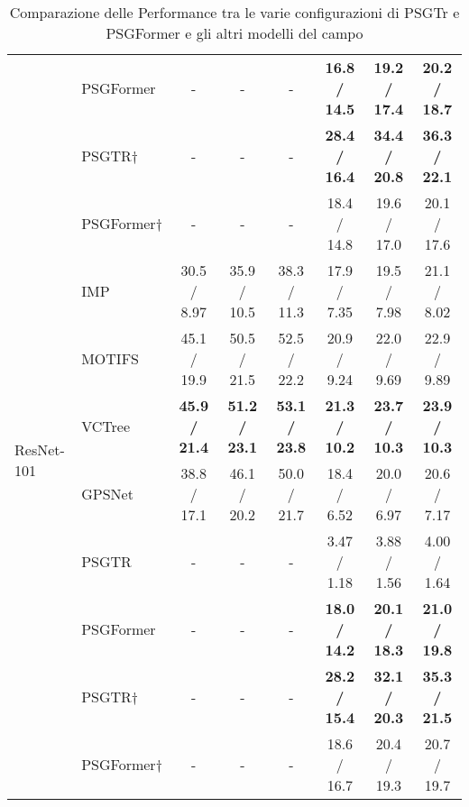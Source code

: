 \begin{table}[H]
{\begin{tabular}{llcccccc}
               & PSGFormer  & -                                            & -                                          & -                    & \textbf{16.8 / 14.5} & \textbf{19.2 / 17.4} & \textbf{20.2 / 18.7} \\
      \cmidrule(lr){2-8}
               & PSGTR†     & -                                            & -                                          & -                    & \textbf{28.4 / 16.4} & \textbf{34.4 / 20.8} & \textbf{36.3 / 22.1} \\
               & PSGFormer† & -                                            & -                                          & -                    & 18.4 / 14.8          & 19.6 / 17.0          & 20.1 / 17.6          \\
      \midrule
      \multirow{6}{*}{ResNet-101}
               & IMP        & 30.5 / 8.97                                  & 35.9 / 10.5                                & 38.3 / 11.3          & 17.9 / 7.35          & 19.5 / 7.98          & 21.1 / 8.02          \\
               & MOTIFS     & 45.1 / 19.9                                  & 50.5 / 21.5                                & 52.5 / 22.2          & 20.9 / 9.24          & 22.0 / 9.69          & 22.9 / 9.89          \\
               & VCTree     & \textbf{45.9 / 21.4}                         & \textbf{51.2 / 23.1}                       & \textbf{53.1 / 23.8} & \textbf{21.3 / 10.2} & \textbf{23.7 / 10.3} & \textbf{23.9 / 10.3} \\
               & GPSNet     & 38.8 / 17.1                                  & 46.1 / 20.2                                & 50.0 / 21.7          & 18.4 / 6.52          & 20.0 / 6.97          & 20.6 / 7.17          \\
      \cmidrule(lr){2-8}
               & PSGTR      & -                                            & -                                          & -                    & 3.47 / 1.18          & 3.88 / 1.56          & 4.00 / 1.64          \\
               & PSGFormer  & -                                            & -                                          & -                    & \textbf{18.0 / 14.2} & \textbf{20.1 / 18.3} & \textbf{21.0 / 19.8} \\
      \cmidrule(lr){2-8}
               & PSGTR†     & -                                            & -                                          & -                    & \textbf{28.2 / 15.4} & \textbf{32.1 / 20.3} & \textbf{35.3 / 21.5} \\
               & PSGFormer† & -                                            & -                                          & -                    & 18.6 / 16.7          & 20.4 / 19.3          & 20.7 / 19.7          \\
      \bottomrule
    \end{tabular}
  }
  \caption{Comparazione delle Performance tra le varie configurazioni di PSGTr e PSGFormer e gli altri modelli del campo}
  \label{tab:results}
\end{table}
